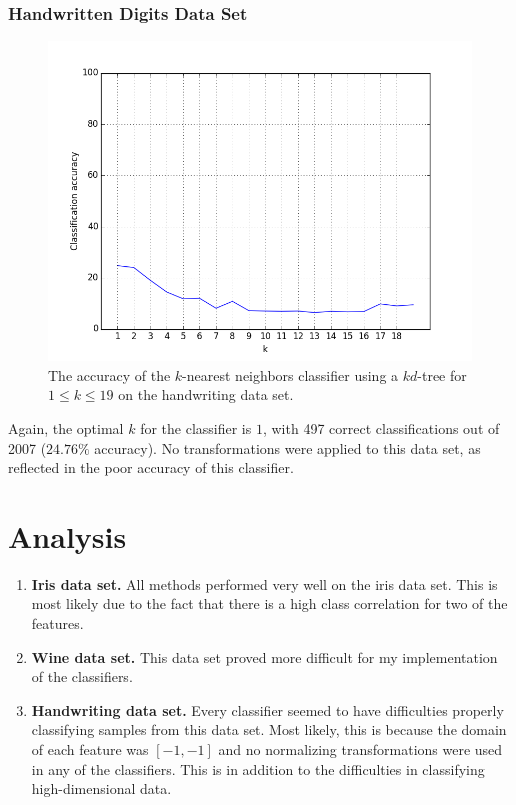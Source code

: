 \documentclass{article}
\numberwithin{figure}{section}
\newcommand{\imgwidth}{.8\textwidth}
\begin{document}
\subsubsection{Handwritten Digits Data Set}
\begin{figure}[H]
\centering
\includegraphics[width=\imgwidth]{knn_kd_hands}
\caption{The accuracy of the $k$-nearest neighbors classifier using a $kd$-tree for $1 \leq k \leq 19$ on the handwriting data set.}
\label{knn:kd:hands}
\end{figure}

Again, the optimal $k$ for the classifier is $1$, with 497 correct classifications out of 2007 ($24.76\%$ accuracy). No transformations were applied to this data set, as reflected in the poor accuracy of this classifier.

\section{Analysis}

\begin{enumerate}
\item {\bf Iris data set.}
All methods performed very well on the iris data set. This is most likely due to the fact that there is a high class correlation for two of the features.

\item {\bf Wine data set.}
This data set proved more difficult for my implementation of the classifiers.

\item {\bf Handwriting data set.}
Every classifier seemed to have difficulties properly classifying samples from this data set. Most likely, this is because the domain of each feature was $[-1, -1]$ and no normalizing transformations were used in any of the classifiers. This is in addition to the difficulties in classifying high-dimensional data.
\end{enumerate}
\end{document}
